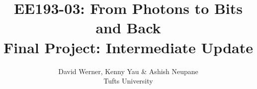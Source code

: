 \documentclass[12pt,onecolumn]{IEEEtran}
\begin{document}
\title{EE193-03: From Photons to Bits and Back\\\LARGE Final Project: Intermediate Update}
\author{David Werner, Kenny Yau \& Ashish Neupane\\Tufts University}
\begin{spacing}{1}
\clearpage\maketitle
\end{spacing}\vspace{-2em}



\end{document}
